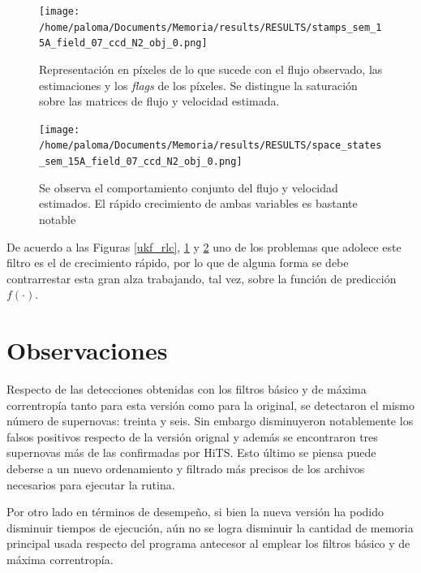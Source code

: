 \begin{figure}
\centering
\texttt{[image: /home/paloma/Documents/Memoria/results/RESULTS/stamps\_sem\_15A\_field\_07\_ccd\_N2\_obj\_0.png]}
\caption{Representaci\'on en p\'ixeles de lo que sucede con el flujo observado, las estimaciones y los \textit{flags} de los p\'ixeles. Se distingue la saturaci\'on sobre las matrices de flujo y velocidad estimada.}
\label{ukf_stamp}
\end{figure}

\begin{figure}
\centering
\texttt{[image: /home/paloma/Documents/Memoria/results/RESULTS/space\_states\_sem\_15A\_field\_07\_ccd\_N2\_obj\_0.png]}
\caption{Se observa el comportamiento conjunto del flujo y velocidad estimados. El r\'apido crecimiento de ambas variables es bastante notable}
\label{ukf_rss}
\end{figure}

De acuerdo a las Figuras \ref{ukf_rlc}, \ref{ukf_stamp} y \ref{ukf_rss} uno de los problemas que adolece este filtro es el de crecimiento r\'apido, por lo que de alguna forma se debe contrarrestar esta gran alza trabajando,  tal vez, sobre la funci\'on de predicci\'on $f(\cdot)$.

\section{Observaciones}
Respecto de las detecciones obtenidas con los filtros b\'asico y de m\'axima correntrop\'ia tanto para esta versi\'on como para la original, se detectaron el mismo  n\'umero de supernovas: treinta y seis. Sin embargo disminuyeron notablemente los falsos positivos respecto de la versi\'on orignal y adem\'as se encontraron tres supernovas m\'as de las confirmadas por HiTS. Esto \'ultimo se piensa puede deberse a un nuevo ordenamiento y filtrado m\'as precisos de los archivos necesarios para ejecutar la rutina.
\bigskip

Por otro lado en t\'erminos de desempe\~no, si bien la nueva versi\'on ha podido disminuir tiempos de ejecuci\'on, a\'un no se logra disminuir la cantidad de memoria principal usada respecto del programa antecesor al emplear los filtros b\'asico y de m\'axima correntrop\'ia.  
